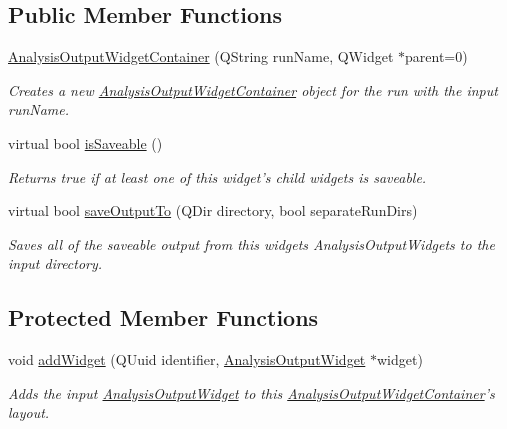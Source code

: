 \subsection*{Public Member Functions}
\begin{DoxyCompactItemize}
\item 
\hypertarget{class_picto_1_1_analysis_output_widget_container_acaa4ef245ef9f724330913b06aeccf95}{\hyperlink{class_picto_1_1_analysis_output_widget_container_acaa4ef245ef9f724330913b06aeccf95}{Analysis\-Output\-Widget\-Container} (Q\-String run\-Name, Q\-Widget $\ast$parent=0)}\label{class_picto_1_1_analysis_output_widget_container_acaa4ef245ef9f724330913b06aeccf95}

\begin{DoxyCompactList}\small\item\em Creates a new \hyperlink{class_picto_1_1_analysis_output_widget_container}{Analysis\-Output\-Widget\-Container} object for the run with the input run\-Name. \end{DoxyCompactList}\item 
\hypertarget{class_picto_1_1_analysis_output_widget_container_a946724f6937684177e2d333e251f5761}{virtual bool \hyperlink{class_picto_1_1_analysis_output_widget_container_a946724f6937684177e2d333e251f5761}{is\-Saveable} ()}\label{class_picto_1_1_analysis_output_widget_container_a946724f6937684177e2d333e251f5761}

\begin{DoxyCompactList}\small\item\em Returns true if at least one of this widget's child widgets is saveable. \end{DoxyCompactList}\item 
virtual bool \hyperlink{class_picto_1_1_analysis_output_widget_container_abed82b90e4457b75480415763a3e2e11}{save\-Output\-To} (Q\-Dir directory, bool separate\-Run\-Dirs)
\begin{DoxyCompactList}\small\item\em Saves all of the saveable output from this widgets Analysis\-Output\-Widgets to the input directory. \end{DoxyCompactList}\end{DoxyCompactItemize}
\subsection*{Protected Member Functions}
\begin{DoxyCompactItemize}
\item 
void \hyperlink{class_picto_1_1_analysis_output_widget_container_a3a88420f7582d082b105642f792ec11d}{add\-Widget} (Q\-Uuid identifier, \hyperlink{class_picto_1_1_analysis_output_widget}{Analysis\-Output\-Widget} $\ast$widget)
\begin{DoxyCompactList}\small\item\em Adds the input \hyperlink{class_picto_1_1_analysis_output_widget}{Analysis\-Output\-Widget} to this \hyperlink{class_picto_1_1_analysis_output_widget_container}{Analysis\-Output\-Widget\-Container}'s layout. \end{DoxyCompactList}\end{DoxyCompactItemize}
